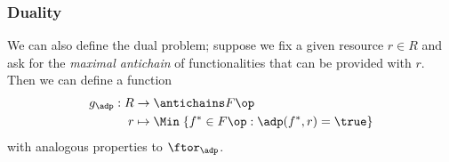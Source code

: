 %
%




\subsubsection{Duality}

We can also define the dual problem; suppose we fix a given resource $r \in R$ and ask for the \emph{maximal antichain} of functionalities that can be provided with $r$.
Then we can define a function
\begin{equation}
    \begin{aligned}
        g_\adp : R & \to \antichains F\op                                      \\
        r          & \mapsto \Min \; \{ f^* \in F\op : \adp(f^*, r) = \true \}
    \end{aligned}
\end{equation}
with analogous properties to $\ftor_\adp$.

